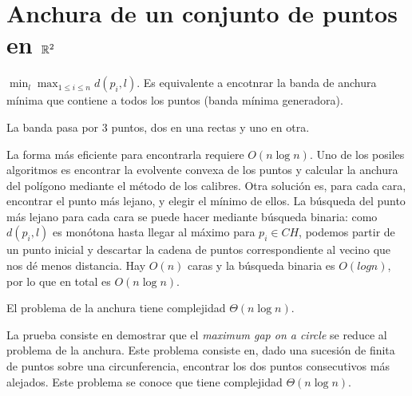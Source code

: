 \documentclass[TGyGC.tex]{subfiles}
\begin{document}
\section{Anchura de un conjunto de puntos en $\mathbb{R}^2$}
$\min_l\max_{1\leq i\leq n}d(p_i,l)$. Es equivalente a encotnrar la banda de anchura mínima que contiene a todos los puntos (banda mínima generadora). 

\begin{prop}
La banda pasa por 3 puntos, dos en una rectas y uno en otra. 
\end{prop}
La forma más eficiente para encontrarla requiere $O(n\log n)$. Uno de los posiles algoritmos es encontrar la evolvente convexa de los puntos y calcular la anchura del polígono mediante el método de los calibres. Otra solución es, para cada cara, encontrar el punto más lejano, y elegir el mínimo de ellos. La búsqueda del punto más lejano para cada cara se puede hacer mediante búsqueda binaria: como $d(p_i,l)$ es monótona hasta llegar al máximo para $p_i\in CH$, podemos partir de un punto inicial y descartar la cadena de puntos correspondiente al vecino que nos dé menos distancia. Hay $O(n)$ caras y la búsqueda binaria es $O(log n)$, por lo que en total es $O(n\log n)$.

\begin{teorema}
El problema de la anchura tiene complejidad $\Theta(n\log n)$.
\end{teorema}
La prueba consiste en demostrar que el \emph{maximum gap on a circle} se reduce al problema de la anchura. Este problema consiste en, dado una sucesión de finita de puntos sobre una circunferencia, encontrar los dos puntos consecutivos más alejados. Este problema se conoce que tiene complejidad $\Theta(n\log n)$. 
\end{document}
